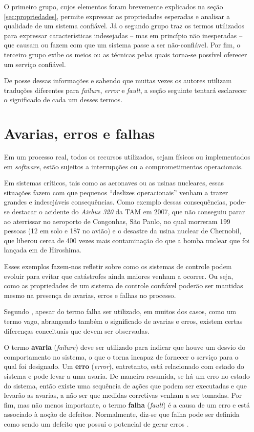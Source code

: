 O primeiro grupo, cujos elementos foram brevemente explicados na seção
\ref{sec:propriedades}, permite expressar as propriedades esperadas e analisar a
qualidade de um sistema confiável. Já o segundo grupo traz os termos utilizados
para expressar características indesejadas -- mas em princípio não inesperadas
-- que causam ou fazem com que um sistema passe a ser não-confiável. Por fim, o
terceiro grupo exibe os meios ou as técnicas pelas quais torna-se possível
oferecer um serviço confiável.

De posse dessas informações e sabendo que muitas vezes os autores utilizam
traduções diferentes para {\it failure}, {\it error} e {\it fault}, a seção
seguinte tentará esclarecer o significado de cada um desses termos.

\section{Avarias, erros e falhas}\label{sec:avaria_erro_falha}
Em um processo real, todos os recursos utilizados, sejam físicos ou
implementados em {\it software}, estão sujeitos a interrupções ou a
comprometimentos operacionais.

Em sistemas críticos, tais como as aeronaves ou as usinas nucleares, essas
situações fazem com que pequenos ``deslizes operacionais'' venham a trazer
grandes e indesejáveis consequências. Como exemplo dessas consequências, pode-se
destacar o acidente do {\it Airbus 320} da TAM em 2007, que não conseguiu parar
ao aterrissar no aeroporto de Congonhas, São Paulo, no qual morreram 199 pessoas
(12 em solo e 187 no avião) e o desastre da usina nuclear de Chernobil, que
liberou cerca de 400 vezes mais contaminação do que a bomba nuclear que foi
lançada em de Hiroshima.

Esses exemplos fazem-nos refletir sobre como os sistemas de controle podem
evoluir para evitar que catástrofes ainda maiores venham a ocorrer. Ou seja,
como as propriedades de um sistema de controle confiável poderão ser mantidas
mesmo na presença de avarias, erros e falhas no processo.

Segundo , apesar do termo falha ser utilizado, em muitos
dos casos, como um termo vago, abrangendo também o significado de avarias e
erros, existem certas diferenças conceituais que devem ser observadas.

O termo {\bf avaria} ({\it failure}) deve ser utilizado para indicar que houve
um desvio do comportamento no sistema, o que o torna incapaz de fornecer o
serviço para o qual foi designado. Um {\bf erro} ({\it error}), entretanto, está
relacionado com estado do sistema e pode levar a uma avaria. De maneira
resumida, se há um erro no estado do sistema, então existe uma sequência de
ações que podem ser executadas e que levarão as avarias, a não ser que medidas
corretivas venham a ser tomadas. Por fim, mas não menos importante, o termo {\bf
falha} ({\it fault}) é a causa de um erro e está associado à noção de defeitos.
Normalmente, diz-se que falha pode ser definida como sendo um defeito que possui
o potencial de gerar erros \cite{nelio:2002,weber:2002}.

